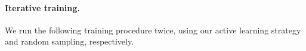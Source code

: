 \documentclass[letterpaper]{article} %
\begin{document}




\paragraph{Iterative training.} We run the following training procedure twice, using our active learning strategy and random sampling, respectively.

\end{document}
